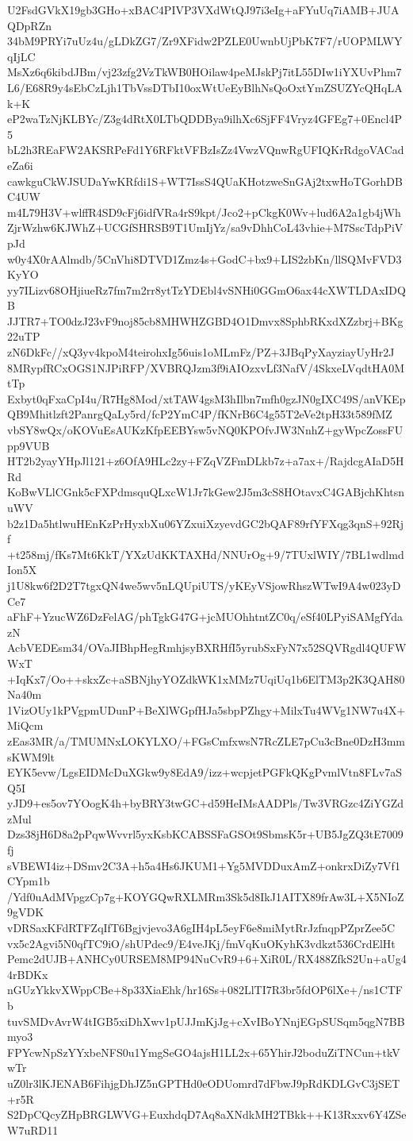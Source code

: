 U2FsdGVkX19gb3GHo+xBAC4PIVP3VXdWtQJ97i3eIg+aFYuUq7iAMB+JUAQDpRZn
34bM9PRYi7uUz4u/gLDkZG7/Zr9XFidw2PZLE0UwnbUjPbK7F7/rUOPMLWYqIjLC
MsXz6q6kibdJBm/vj23zfg2VzTkWB0HOilaw4peMJskPj7itL55DIw1iYXUvPhm7
L6/E68R9y4sEbCzLjh1TbVssDTbI10oxWtUeEyBlhNsQoOxtYmZSUZYcQHqLAk+K
eP2waTzNjKLBYc/Z3g4dRtX0LTbQDDBya9ilhXc6SjFF4Vryz4GFEg7+0Encl4P5
bL2h3REaFW2AKSRPeFd1Y6RFktVFBzIsZz4VwzVQnwRgUFIQKrRdgoVACadeZa6i
cawkguCkWJSUDaYwKRfdi1S+WT7IssS4QUaKHotzweSnGAj2txwHoTGorhDBC4UW
m4L79H3V+wlffR4SD9cFj6idfVRa4rS9kpt/Jco2+pCkgK0Wv+lud6A2a1gb4jWh
ZjrWzhw6KJWhZ+UCGfSHRSB9T1UmIjYz/sa9vDhhCoL43vhie+M7SscTdpPiVpJd
w0y4X0rAAlmdb/5CnVhi8DTVD1Zmz4s+GodC+bx9+LIS2zbKn/llSQMvFVD3KyYO
yy7ILizv68OHjiueRz7fm7m2rr8ytTzYDEbl4vSNHi0GGmO6ax44cXWTLDAxIDQB
JJTR7+TO0dzJ23vF9noj85cb8MHWHZGBD4O1Dmvx8SphbRKxdXZzbrj+BKg22uTP
zN6DkFc//xQ3yv4kpoM4teirohxIg56uis1oMLmFz/PZ+3JBqPyXayziayUyHr2J
8MRypfRCxOGS1NJPiRFP/XVBRQJzm3f9iAIOzxvLf3NafV/4SkxeLVqdtHA0MtTp
Exbyt0qFxaCpI4u/R7Hg8Mod/xtTAW4gsM3hIlbn7mfh0gzJN0gIXC49S/anVKEp
QB9Mhitlzft2PanrgQaLy5rd/fcP2YmC4P/fKNrB6C4g55T2eVe2tpH33t589fMZ
vbSY8wQx/oKOVuEsAUKzKfpEEBYsw5vNQ0KPOfvJW3NnhZ+gyWpcZossFUpp9VUB
HT2b2yayYHpJl121+z6OfA9HLc2zy+FZqVZFmDLkb7z+a7ax+/RajdcgAIaD5HRd
KoBwVLlCGnk5cFXPdmsquQLxcW1Jr7kGew2J5m3cS8HOtavxC4GABjchKhtsnuWV
b2z1Da5htlwuHEnKzPrHyxbXu06YZxuiXzyevdGC2bQAF89rfYFXqg3qnS+92Rjf
+t258mj/fKs7Mt6KkT/YXzUdKKTAXHd/NNUrOg+9/7TUxlWIY/7BL1wdlmdIon5X
j1U8kw6f2D2T7tgxQN4we5wv5nLQUpiUTS/yKEyVSjowRhszWTwI9A4w023yDCe7
aFhF+YzucWZ6DzFelAG/phTgkG47G+jcMUOhhtntZC0q/eSf40LPyiSAMgfYdazN
AcbVEDEsm34/OVaJIBhpHegRmhjsyBXRHfI5yrubSxFyN7x52SQVRgdl4QUFWWxT
+IqKx7/Oo++skxZc+aSBNjhyYOZdkWK1xMMz7UqiUq1b6ElTM3p2K3QAH80Na40m
1VizOUy1kPVgpmUDunP+BeXlWGpfHJa5sbpPZhgy+MilxTu4WVg1NW7u4X+MiQcm
zEas3MR/a/TMUMNxLOKYLXO/+FGsCmfxwsN7RcZLE7pCu3cBne0DzH3mmsKWM9lt
EYK5evw/LgsEIDMcDuXGkw9y8EdA9/izz+wcpjetPGFkQKgPvmlVtn8FLv7aSQ5I
yJD9+es5ov7YOogK4h+byBRY3twGC+d59HeIMsAADPls/Tw3VRGzc4ZiYGZdzMul
Dzs38jH6D8a2pPqwWvvrl5yxKsbKCABSSFaGSOt9SbmsK5r+UB5JgZQ3tE7009fj
sVBEWI4iz+DSmv2C3A+h5a4Hs6JKUM1+Yg5MVDDuxAmZ+onkrxDiZy7Vf1CYpm1b
/Ydf0uAdMVpgzCp7g+KOYGQwRXLMRm3Sk5d8IkJ1AITX89frAw3L+X5NIoZ9gVDK
vDRSaxKFdRTFZqIfT6Bgjvjevo3A6gIH4pL5eyF6e8miMytRrJzfnqpPZprZee5C
vx5c2Agvi5N0qfTC9iO/shUPdec9/E4veJKj/fmVqKuOKyhK3vdkzt536CrdElHt
Pemc2dUJB+ANHCy0URSEM8MP94NuCvR9+6+XiR0L/RX488ZfkS2Un+aUg44rBDKx
nGUzYkkvXWppCBe+8p33XiaEhk/hr16Ss+082LlTI7R3br5fdOP6lXe+/ns1CTFb
tuvSMDvAvrW4tIGB5xiDhXwv1pUJJmKjJg+cXvIBoYNnjEGpSUSqm5qgN7BBmyo3
FPYcwNpSzYYxbeNFS0u1YmgSeGO4ajsH1LL2x+65YhirJ2boduZiTNCun+tkVwTr
uZ0lr3lKJENAB6FihjgDhJZ5nGPTHd0eODUomrd7dFbwJ9pRdKDLGvC3jSET+r5R
S2DpCQcyZHpBRGLWVG+EuxhdqD7Aq8aXNdkMH2TBkk++K13Rxxv6Y4ZSeW7uRD11

